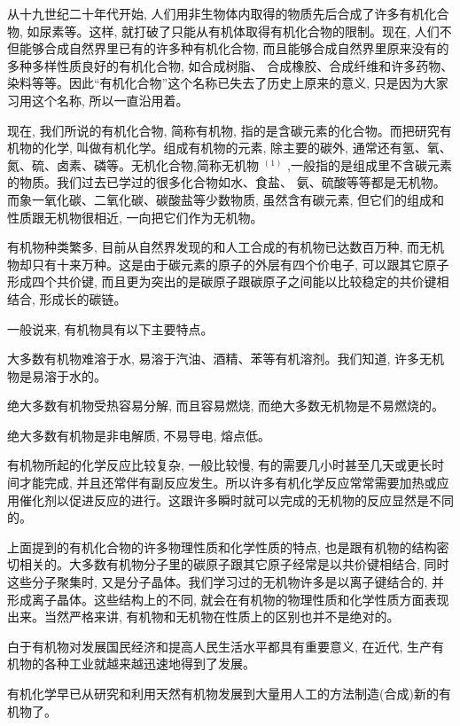 \documentclass[10pt]{article}
\newcommand{\customfootnote}[1]{
  \let\thefootnote\relax\footnotetext{#1}
}
\begin{document}
从十九世纪二十年代开始, 人们用非生物体内取得的物质先后合成了许多有机化合物, 如尿素等。这样, 就打破了只能从有机体取得有机化合物的限制。现在, 人们不但能够合成自然界里已有的许多种有机化合物, 而且能够合成自然界里原来没有的多种多样性质良好的有机化合物, 如合成树脂、 合成橡胶、合成纤维和许多药物、染料等等。因此“有机化合物”这个名称已失去了历史上原来的意义, 只是因为大家习用这个名称, 所以一直沿用着。

现在, 我们所说的有机化合物, 简称有机物, 指的是含碳元素的化合物。而把研究有机物的化学, 叫做有机化学。组成有机物的元素, 除主要的碳外, 通常还有氢、氧、氮、硫、卤素、磷等。无机化合物,简称无机物 \({}^{\left( 1\right) }\) ,一般指的是组成里不含碳元素的物质。我们过去已学过的很多化合物如水、食盐、 氨、硫酸等等都是无机物。而象一氧化碳、二氧化碳、碳酸盐等少数物质, 虽然含有碳元素, 但它们的组成和性质跟无机物很相近, 一向把它们作为无机物。

\customfootnote{

① 无机物里也包括单质。

}

有机物种类繁多, 目前从自然界发现的和人工合成的有机物已达数百万种, 而无机物却只有十来万种。这是由于碳元素的原子的外层有四个价电子, 可以跟其它原子形成四个共价键, 而且更为突出的是碳原子跟碳原子之间能以比较稳定的共价键相结合, 形成长的碳链。

一般说来, 有机物具有以下主要特点。

大多数有机物难溶于水, 易溶于汽油、酒精、苯等有机溶剂。我们知道, 许多无机物是易溶于水的。

绝大多数有机物受热容易分解, 而且容易燃烧, 而绝大多数无机物是不易燃烧的。

绝大多数有机物是非电解质, 不易导电, 熔点低。

有机物所起的化学反应比较复杂, 一般比较慢, 有的需要几小时甚至几天或更长时间才能完成, 并且还常伴有副反应发生。所以许多有机化学反应常常需要加热或应用催化剂以促进反应的进行。这跟许多瞬时就可以完成的无机物的反应显然是不同的。

上面提到的有机化合物的许多物理性质和化学性质的特点, 也是跟有机物的结构密切相关的。大多数有机物分子里的碳原子跟其它原子经常是以共价键相结合, 同时这些分子聚集时, 又是分子晶体。我们学习过的无机物许多是以离子键结合的, 并形成离子晶体。这些结构上的不同, 就会在有机物的物理性质和化学性质方面表现出来。当然严格来讲, 有机物和无机物在性质上的区别也并不是绝对的。

白于有机物对发展国民经济和提高人民生活水平都具有重要意义, 在近代, 生产有机物的各种工业就越来越迅速地得到了发展。

有机化学早已从研究和利用天然有机物发展到大量用人工的方法制造(合成)新的有机物了。
\end{document}
